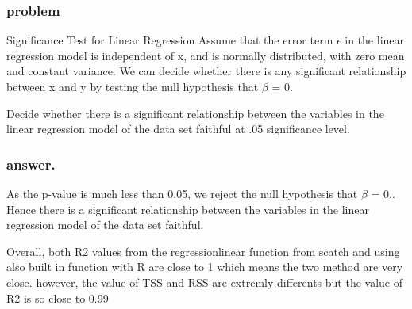 \documentclass[a4paper,conference]{IEEEtran}
\begin{document}
\hypertarget{sec:problem}{%
\subsubsection{problem}\label{sec:problem}}

Significance Test for Linear Regression Assume that the error term
\(\epsilon\) in the linear regression model is independent of x, and is
normally distributed, with zero mean and constant variance. We can
decide whether there is any significant relationship between x and y by
testing the null hypothesis that \(\beta\) = 0.

Decide whether there is a significant relationship between the variables
in the linear regression model of the data set faithful at .05
significance level.

\hypertarget{sec:answer.}{%
\subsubsection{answer.}\label{sec:answer.}}

As the p-value is much less than 0.05, we reject the null hypothesis
that \(\beta\) = 0.. Hence there is a significant relationship between
the variables in the linear regression model of the data set faithful.

Overall, both R2 values from the regressionlinear function from scatch
and using also built in function with R are close to 1 which means the
two method are very close. however, the value of TSS and RSS are
extremly differents but the value of R2 is so close to 0.99


\end{document}

